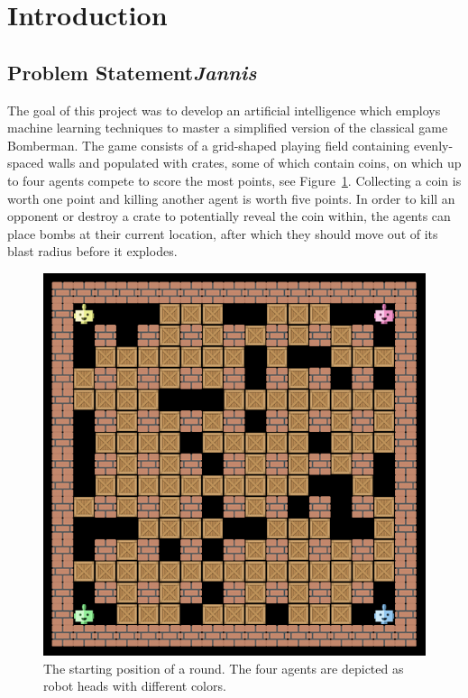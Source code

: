 \documentclass{article}
\begin{document}


\tableofcontents

\clearpage


\section{Introduction}

\subsection[Problem Statement]{{Problem Statement}\normalsize \normalfont \it \hfill Jannis}

The goal of this project was to develop an artificial intelligence which employs machine learning techniques to master a simplified version of the classical game Bomberman. The game consists of a grid-shaped playing field containing evenly-spaced walls and populated with crates, some of which contain coins, on which up to four agents compete to score the most points, see Figure~\ref{fig:bomberman-startpos}. Collecting a coin is worth one point and killing another agent is worth five points. In order to kill an opponent or destroy a crate to potentially reveal the coin within, the agents can place bombs at their current location, after which they should move out of its blast radius before it explodes.

\begin{figure}[h]
    \centering
    \includegraphics[width=.6\linewidth]{figures/bomberman_startpos.png}
    \caption{The starting position of a round. The four agents are depicted as robot heads with different colors.}
    \label{fig:bomberman-startpos}
\end{figure}
\end{document}
